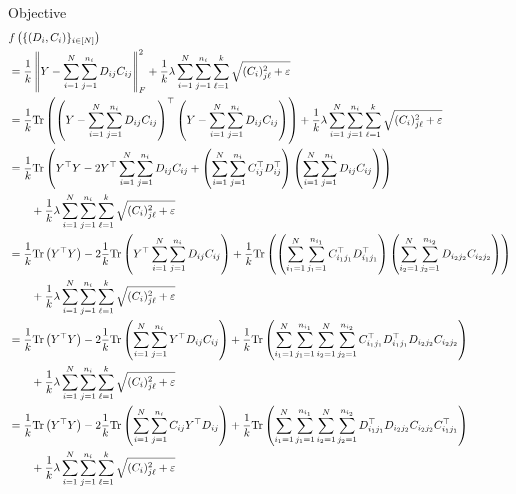 Objective
\begin{align}
    &f\left(\{(D_i,C_i)\}_{i\in\seq{N}}\right)
    \\
    &= \frac{1}{k} \norm{Y - \sum_{i=1}^N \sum_{j=1}^{n_i} D_{ij} C_{ij}}_F^2 + \frac{1}{k} \lambda \sum_{i=1}^N \sum_{j=1}^{n_i} \sum_{\ell=1}^k \sqrt{(C_i)_{j\ell}^2 + \varepsilon}
    \\
    &= \frac{1}{k} \trace\left(\left(Y - \sum_{i=1}^N \sum_{j=1}^{n_i} D_{ij} C_{ij}\right)^\top\left(Y - \sum_{i=1}^N \sum_{j=1}^{n_i} D_{ij} C_{ij}\right)\right) + \frac{1}{k} \lambda \sum_{i=1}^N \sum_{j=1}^{n_i} \sum_{\ell=1}^k \sqrt{(C_i)_{j\ell}^2 + \varepsilon}
    \\
    &= \frac{1}{k} \trace\left( Y^\top Y - 2Y^\top \sum_{i=1}^N \sum_{j=1}^{n_i} D_{ij} C_{ij} + \left(\sum_{i=1}^N \sum_{j=1}^{n_i} C_{ij}^\top D_{ij}^\top \right) \left(\sum_{i=1}^N \sum_{j=1}^{n_i} D_{ij} C_{ij}\right) \right) \\
    &\qquad + \frac{1}{k} \lambda \sum_{i=1}^N \sum_{j=1}^{n_i} \sum_{\ell=1}^k \sqrt{(C_i)_{j\ell}^2 + \varepsilon}
    \\
    &= \frac{1}{k} \trace\left( Y^\top Y \right)
    - 2\frac{1}{k} \trace\left( Y^\top \sum_{i=1}^N \sum_{j=1}^{n_i} D_{ij} C_{ij} \right)
    + \frac{1}{k} \trace\left( \left(\sum_{i_1=1}^N \sum_{j_1=1}^{n_{i_1}} C_{i_1j_1}^\top D_{i_1j_1}^\top \right) \left(\sum_{i_2=1}^N \sum_{j_2=1}^{n_{i_2}} D_{i_2j_2} C_{i_2j_2}\right) \right) \\
    &\qquad + \frac{1}{k} \lambda \sum_{i=1}^N \sum_{j=1}^{n_i} \sum_{\ell=1}^k \sqrt{(C_i)_{j\ell}^2 + \varepsilon}
    \\
    &= \frac{1}{k} \trace\left( Y^\top Y \right)
    - 2\frac{1}{k} \trace\left( \sum_{i=1}^N \sum_{j=1}^{n_i} Y^\top D_{ij} C_{ij} \right)
    + \frac{1}{k} \trace\left( \sum_{i_1=1}^N \sum_{j_1=1}^{n_{i_1}} \sum_{i_2=1}^N \sum_{j_2=1}^{n_{i_2}} C_{i_1j_1}^\top D_{i_1j_1}^\top D_{i_2j_2} C_{i_2j_2} \right) \\
    &\qquad + \frac{1}{k} \lambda \sum_{i=1}^N \sum_{j=1}^{n_i} \sum_{\ell=1}^k \sqrt{(C_i)_{j\ell}^2 + \varepsilon}
    \\
    &= \frac{1}{k} \trace\left( Y^\top Y \right)
    - 2\frac{1}{k} \trace\left( \sum_{i=1}^N \sum_{j=1}^{n_i} C_{ij} Y^\top D_{ij} \right)
    + \frac{1}{k} \trace\left( \sum_{i_1=1}^N \sum_{j_1=1}^{n_{i_1}} \sum_{i_2=1}^N \sum_{j_2=1}^{n_{i_2}} D_{i_1j_1}^\top D_{i_2j_2} C_{i_2j_2} C_{i_1j_1}^\top \right) \\
    &\qquad + \frac{1}{k} \lambda \sum_{i=1}^N \sum_{j=1}^{n_i} \sum_{\ell=1}^k \sqrt{(C_i)_{j\ell}^2 + \varepsilon}

\end{align}
